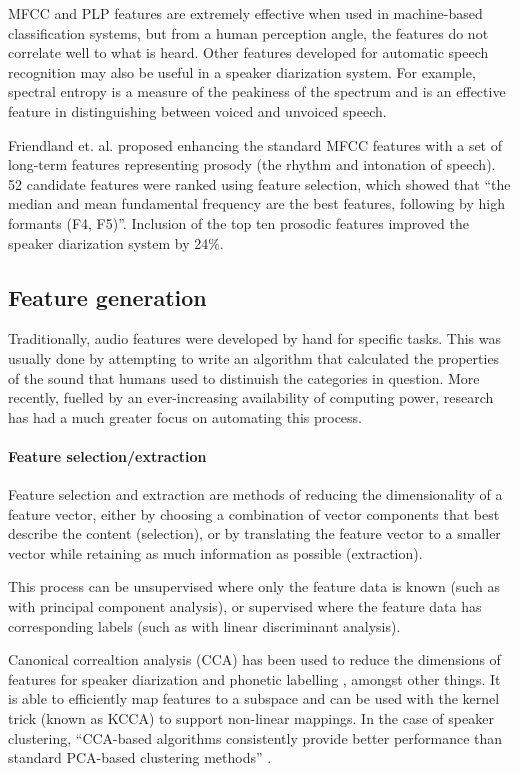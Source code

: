 MFCC and PLP features are extremely effective when used in machine-based
classification systems, but from a human perception angle, the features do not
correlate well to what is heard.  Other features developed for automatic speech
recognition may also be useful in a speaker diarization system. For example,
spectral entropy \citep{Misra2004} is a measure of the peakiness of the spectrum
and is an effective feature in distinguishing between voiced and unvoiced
speech.

Friendland et. al. \citep{Friedland2009} proposed enhancing the standard MFCC
features with a set of long-term features representing prosody (the rhythm and
intonation of speech). 52 candidate features were ranked using feature
selection, which showed that ``the median and mean fundamental frequency are
the best features, following by high formants (F4, F5)''. Inclusion of the
top ten prosodic features improved the speaker diarization system by 24\%.

\subsection{Feature generation}\label{sec:litreviewgeneration}
Traditionally, audio features were developed by hand for specific tasks. This
was usually done by attempting to write an algorithm that calculated the
properties of the sound that humans used to distinuish the categories in
question. More recently, fuelled by an ever-increasing availability of
computing power, research has had a much greater focus on automating
this process.

\paragraph{Feature selection/extraction}
Feature selection and extraction are methods of reducing the dimensionality of
a feature vector, either by choosing a combination of vector components that
best describe the content (selection), or by translating the feature vector to
a smaller vector while retaining as much information as possible (extraction).

This process can be unsupervised where only the feature data is known (such as
with principal component analysis), or supervised where the feature data has
corresponding labels (such as with linear discriminant analysis).

Canonical correaltion analysis (CCA) has been used to reduce the dimensions of
features for speaker diarization \citep{Chaudhuri2009} and phonetic labelling
\citep{Arora2014}, amongst other things. It is able to efficiently map features
to a subspace and can be used with the kernel trick (known as KCCA) to support
non-linear mappings. In the case of speaker clustering, ``CCA-based algorithms
consistently provide better performance than standard PCA-based clustering
methods'' \citep{Chaudhuri2009}.

